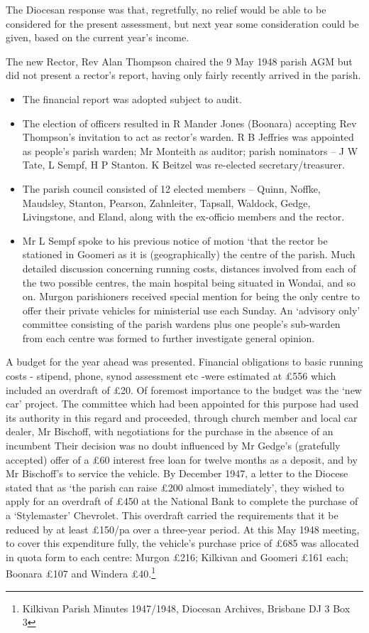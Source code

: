 The Diocesan response was that, regretfully, no relief would be able to
be considered for the present assessment, but next year some
consideration could be given, based on the current year's income.

The new Rector, Rev Alan Thompson chaired the 9 May 1948 parish AGM but
did not present a rector's report, having only fairly recently arrived
in the parish.

\begin{itemize}
\item
  The financial report was adopted subject to audit.
\item
  The election of officers resulted in R Mander Jones (Boonara)
  accepting Rev Thompson's invitation to act as rector's warden. R B
  Jeffries was appointed as people's parish warden; Mr Monteith as
  auditor; parish nominators -- J W Tate, L Sempf, H P Stanton. K
  Beitzel was re-elected secretary/treasurer.
\item
  The parish council consisted of 12 elected members -- Quinn, Noffke,
  Maudsley, Stanton, Pearson, Zahnleiter, Tapsall, Waldock, Gedge,
  Livingstone, and Eland, along with the ex-officio members and the
  rector.
\item
  Mr L Sempf spoke to his previous notice of motion `that the rector be
  stationed in Goomeri as it is (geographically) the centre of the
  parish. Much detailed discussion concerning running costs, distances
  involved from each of the two possible centres, the main hospital
  being situated in Wondai, and so on. Murgon parishioners received
  special mention for being the only centre to offer their private
  vehicles for ministerial use each Sunday. An `advisory only' committee
  consisting of the parish wardens plus one people's sub-warden from
  each centre was formed to further investigate general opinion.
\end{itemize}

A budget for the year ahead was presented. Financial obligations to
basic running costs - stipend, phone, synod assessment etc -were
estimated at \pounds556 which included an overdraft of \pounds20. Of foremost
importance to the budget was the `new car' project. The committee which
had been appointed for this purpose had used its authority in this
regard and proceeded, through church member and local car dealer, Mr
Bischoff, with negotiations for the purchase in the absence of an
incumbent Their decision was no doubt influenced by Mr Gedge's
(gratefully accepted) offer of a \pounds60 interest free loan for twelve
months as a deposit, and by Mr Bischoff's to service the vehicle. By
December 1947, a letter to the Diocese stated that as `the parish can
raise \pounds200 almost immediately', they wished to apply for an overdraft of
\pounds450 at the National Bank to complete the purchase of a `Stylemaster'
Chevrolet. This overdraft carried the requirements that it be reduced by
at least \pounds150/pa over a three-year period. At this May 1948 meeting, to
cover this expenditure fully, the vehicle's purchase price of \pounds685 was
allocated in quota form to each centre: Murgon \pounds216; Kilkivan and
Goomeri \pounds161 each; Boonara \pounds107 and Windera \pounds40.\footnote{Kilkivan
  Parish Minutes 1947/1948, Diocesan Archives, Brisbane DJ 3 Box 3}

